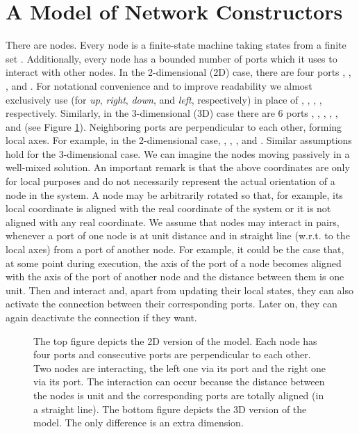 \documentclass[oribibl, 11pt]{llncs}
\begin{document}
\section{A Model of Network Constructors}
\label{sec:model}

There are  nodes. Every node is a finite-state machine taking states from a finite set . Additionally, every node has a bounded number of ports which it uses to interact with other nodes. In the 2-dimensional (2D) case, there are four ports , , , and . For notational convenience and to improve readability we almost exclusively use  (for \emph{up}, \emph{right}, \emph{down}, and \emph{left}, respectively) in place of , , , , respectively. Similarly, in the 3-dimensional (3D) case there are 6 ports , , , , , and  (see Figure \ref{fig:node-ports}). Neighboring ports are perpendicular to each other, forming local axes. For example, in the 2-dimensional case, , , , and . Similar assumptions hold for the 3-dimensional case.  We can imagine the nodes moving passively in a well-mixed solution. An important remark is that the above coordinates are only for local purposes and do not necessarily represent the actual orientation of a node in the system. A node may be arbitrarily rotated so that, for example, its  local coordinate is aligned with the  real coordinate of the system or it is not aligned with any real coordinate. We assume that nodes may interact in pairs, whenever a port of one node is at unit distance and in straight line (w.r.t. to the local axes) from a port of another node. For example, it could be the case that, at some point during execution, the axis of the  port of a node  becomes aligned with the axis of the  port of another node  and the distance between them is one unit. Then  and  interact and, apart from updating their local states, they can also activate the connection between their corresponding ports. Later on, they can again deactivate the connection if they want.

\begin{figure}[!hbtp]
\caption{The top figure depicts the 2D version of the model. Each node has four ports and consecutive ports are perpendicular to each other. Two nodes are interacting, the left one via its  port and the right one via its  port. The interaction can occur because the distance between the nodes is unit and the corresponding ports are totally aligned (in a straight line). The bottom figure depicts the 3D version of the model. The only difference is an extra  dimension.} \label{fig:node-ports}
\end{figure}
\end{document}

